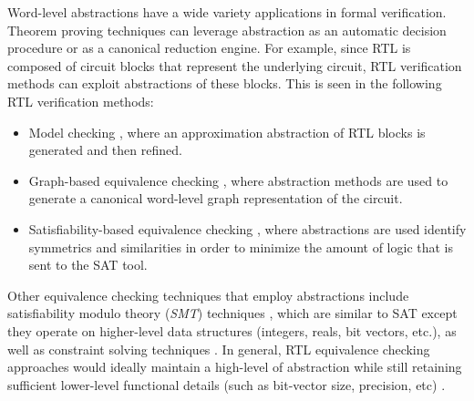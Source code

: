 
Word-level abstractions have a wide variety applications in formal 
verification. Theorem proving techniques can leverage abstraction as an 
automatic decision procedure or as a canonical reduction 
engine. For example, since RTL is composed of circuit blocks that represent 
the underlying circuit, RTL verification methods can exploit 
abstractions of these blocks.
This is seen in the following RTL verification methods:
\begin{itemize}  
\item Model checking \cite{kroening:model}, 
where an approximation abstraction of RTL blocks is generated and then 
refined.
\item Graph-based equivalence 
checking \cite{WLS} \cite{arditi:bmd}, where abstraction methods are used
to generate a canonical word-level graph representation of the circuit.
\item Satisfiability-based equivalence checking \cite{lpsat}, where 
abstractions are used identify symmetrics and similarities in order to 
minimize the amount of logic that is sent to the 
SAT tool. 
\end{itemize}

Other equivalence checking techniques that employ abstractions 
include satisfiability modulo theory ({\it SMT}) techniques \cite{boolector} \cite{bryant:tacas07}, 
which are similar to SAT except they operate on higher-level data
structures (integers, reals, bit vectors, etc.), as well as 
constraint solving techniques \cite {ms:research} \cite{tew:iccad08}.
In general, RTL equivalence checking approaches would ideally maintain a 
high-level of abstraction while still retaining sufficient lower-level 
functional details  (such as bit-vector size, precision, etc) 
\cite{gupta_survey}.

